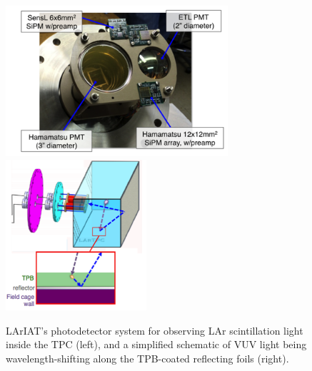 \begin{figure}
\centering
\includegraphics[height=2.2in]{Chapter-3/Images/lightsys_pmts.png}
\hspace{1cm}
\includegraphics[height=2.2in]{Chapter-3/Images/lightsys_wls.png}
\caption{LArIAT's photodetector system for observing LAr scintillation light inside the TPC (left), and a simplified schematic of VUV light being wavelength-shifting along the TPB-coated reflecting foils (right).}
\label{lightsys_pmts}
\end{figure}
